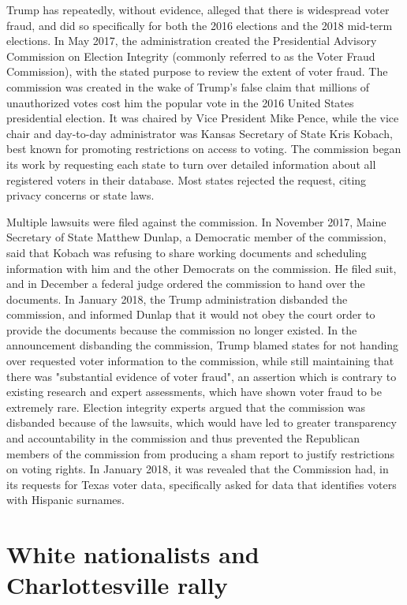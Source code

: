 Trump has repeatedly, without evidence, alleged that there is widespread
voter fraud, and did so specifically for both the 2016 elections and the
2018 mid-term elections. In May 2017, the administration created the
Presidential Advisory Commission on Election Integrity (commonly
referred to as the Voter Fraud Commission), with the stated purpose to
review the extent of voter fraud. The commission was created in the wake
of Trump's false claim that millions of unauthorized votes cost him the
popular vote in the 2016 United States presidential election. It was
chaired by Vice President Mike Pence, while the vice chair and
day-to-day administrator was Kansas Secretary of State Kris Kobach, best
known for promoting restrictions on access to voting. The commission
began its work by requesting each state to turn over detailed
information about all registered voters in their database. Most states
rejected the request, citing privacy concerns or state laws.

Multiple lawsuits were filed against the commission. In November 2017,
Maine Secretary of State Matthew Dunlap, a Democratic member of the
commission, said that Kobach was refusing to share working documents and
scheduling information with him and the other Democrats on the
commission. He filed suit, and in December a federal judge ordered the
commission to hand over the documents. In January 2018, the Trump
administration disbanded the commission, and informed Dunlap that it
would not obey the court order to provide the documents because the
commission no longer existed. In the announcement disbanding the
commission, Trump blamed states for not handing over requested voter
information to the commission, while still maintaining that there was
"substantial evidence of voter fraud", an assertion which is contrary to
existing research and expert assessments, which have shown voter fraud
to be extremely rare. Election integrity experts argued that the
commission was disbanded because of the lawsuits, which would have led
to greater transparency and accountability in the commission and thus
prevented the Republican members of the commission from producing a sham
report to justify restrictions on voting rights. In January 2018, it was
revealed that the Commission had, in its requests for Texas voter data,
specifically asked for data that identifies voters with Hispanic
surnames.

\section{White nationalists and Charlottesville
rally}\label{white-nationalists-and-charlottesville-rally}


